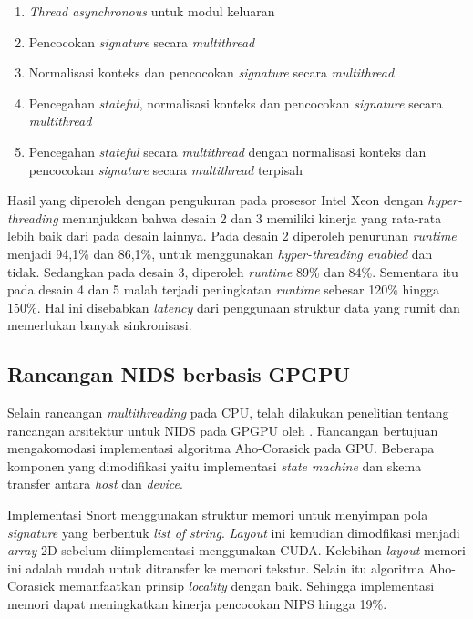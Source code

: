     \begin{enumerate}
      \item \emph{Thread asynchronous} untuk modul keluaran
      \item Pencocokan \emph{signature} secara \emph{multithread}
      \item Normalisasi konteks dan pencocokan \emph{signature} secara \emph{multithread}
      \item Pencegahan \emph{stateful}, normalisasi konteks dan pencocokan \emph{signature} secara \emph{multithread}
      \item Pencegahan \emph{stateful} secara \emph{multithread} dengan normalisasi konteks dan pencocokan \emph{signature} secara \emph{multithread} terpisah
    \end{enumerate}

    Hasil yang diperoleh dengan pengukuran pada prosesor Intel Xeon dengan \emph{hyper-threading} menunjukkan bahwa desain 2 dan 3 memiliki kinerja yang rata-rata lebih baik dari pada desain lainnya. Pada desain 2 diperoleh penurunan \emph{runtime} menjadi 94,1\% dan 86,1\%, untuk menggunakan \emph{hyper-threading enabled} dan tidak. Sedangkan pada desain 3, diperoleh \emph{runtime} 89\% dan 84\%. Sementara itu pada desain 4 dan 5 malah terjadi peningkatan \emph{runtime} sebesar 120\% hingga 150\%. Hal ini disebabkan \emph{latency} dari penggunaan struktur data yang rumit dan memerlukan banyak sinkronisasi.

  \subsection{Rancangan NIDS berbasis GPGPU}

    Selain rancangan \emph{multithreading} pada CPU, telah dilakukan penelitian tentang rancangan arsitektur untuk NIDS pada GPGPU oleh \cite{gnort2008}. Rancangan bertujuan mengakomodasi implementasi algoritma Aho-Corasick pada GPU. Beberapa komponen yang dimodifikasi yaitu implementasi \emph{state machine} dan skema transfer antara \emph{host} dan \emph{device}.

    Implementasi Snort menggunakan struktur memori untuk menyimpan pola \emph{signature} yang berbentuk \emph{list of string}. \emph{Layout} ini kemudian dimodfikasi menjadi \emph{array} 2D sebelum diimplementasi menggunakan CUDA. Kelebihan \emph{layout} memori ini adalah mudah untuk ditransfer ke memori tekstur. Selain itu algoritma Aho-Corasick memanfaatkan prinsip \emph{locality} dengan baik. Sehingga implementasi memori dapat meningkatkan kinerja pencocokan NIPS hingga 19\%.

